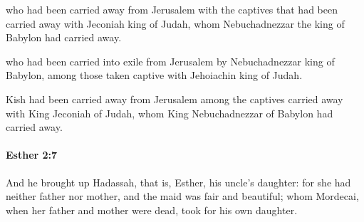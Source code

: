			\begin{versebox}
					\item[BHS] 
					\item[LXX] 
					\item[ASV] who had been carried away from Jerusalem with the captives that had been carried away with Jeconiah king of Judah, whom Nebuchadnezzar the king of Babylon had carried away.
					\item[NIV] who had been carried into exile from Jerusalem by Nebuchadnezzar king of Babylon, among those taken captive with Jehoiachin king of Judah.
					\item[NRSV] Kish had been carried away from Jerusalem among the captives carried away with King Jeconiah of Judah, whom King Nebuchadnezzar of Babylon had carried away.
			\end{versebox}

		\paragraph{Esther 2:7} %
			\label{ESTHER-2-7}

			And he brought up Hadassah, that is, Esther, his uncle’s daughter: for she had neither father nor mother, and the maid was fair and beautiful; whom Mordecai, when her father and mother were dead, took for his own daughter.

